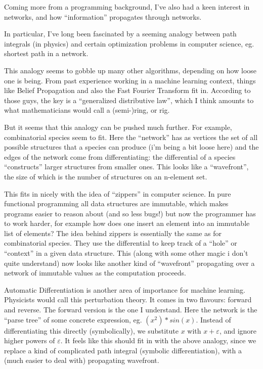 \documentclass[11pt]{article}
\begin{document}
Coming more from a programming background, I've also had a keen
interest in networks, and how ``information'' propagates through networks.

In particular, I've long been fascinated by a seeming analogy
between path integrals (in physics) and certain optimization problems
in computer science, eg. shortest path in a network.

This analogy seems to gobble up many other algorithms, depending on how
loose one is being. From past experience working in a machine
learning context, things like Belief Propagation and also
the Fast Fourier Transform fit in. According to those guys,
the key is a ``generalized distributive law'', which I think
amounts to what mathematicians would call a (semi-)ring, or rig.

But it seems that this analogy can be pushed much further.
For example, combinatorial species seem to fit. Here the ``network''
has as vertices the set of all possible structures that a species
can produce (i'm being a bit loose here) and the edges of the
network come from differentiating: the differential of
a species ``constructs'' larger structures from smaller ones.
This looks like a ``wavefront'', the size of which is the
number of structures on an n-element set.

This fits in nicely with the idea of ``zippers'' in 
computer science. In pure functional programming all
data structures are immutable, which makes programs easier
to reason about (and so less bugs!) but now the programmer
has to work harder, for example how does one insert an
element into an immutable list of elements? The idea behind
zippers is essentially the same as for combinatorial
species. They use the differential to keep track of a
``hole'' or ``context'' in a given data structure. This 
(along with some other magic i don't quite understand)
now looks like another kind of ``wavefront'' propagating 
over a network of immutable values as the computation proceeds.

Automatic Differentiation is another area of importance
for machine learning. Physicists would
call this perturbation theory. It comes in two
flavours: forward and reverse. The forward version
is the one I understand. Here the network is the
``parse tree'' of some concrete expression, eg. $(x^2)*sin(x)$.
Instead of differentiating this directly (symbolically),
we substitute $x$ with $x+\varepsilon$, and ignore higher powers of $\varepsilon$.
It feels like this should fit in with the above analogy,
since we replace a kind of complicated path integral 
(symbolic differentiation), 
with a (much easier to deal with) propagating wavefront.
\end{document}
